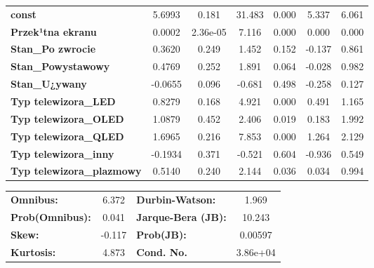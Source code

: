 \documentclass[11pt,a4paper]{article}
\begin{document}
\begin{center}
\begin{tabular}{lcccccc}
					\textbf{const}                    &       5.6993  &        0.181     &    31.483  &         0.000        &        5.337    &        6.061     \\
					\textbf{Przek¹tna ekranu}         &       0.0002  &     2.36e-05     &     7.116  &         0.000        &        0.000    &        0.000     \\
					\textbf{Stan\_Po zwrocie}         &       0.3620  &        0.249     &     1.452  &         0.152        &       -0.137    &        0.861     \\
					\textbf{Stan\_Powystawowy}        &       0.4769  &        0.252     &     1.891  &         0.064        &       -0.028    &        0.982     \\
					\textbf{Stan\_U¿ywany}            &      -0.0655  &        0.096     &    -0.681  &         0.498        &       -0.258    &        0.127     \\
					\textbf{Typ telewizora\_LED}      &       0.8279  &        0.168     &     4.921  &         0.000        &        0.491    &        1.165     \\
					\textbf{Typ telewizora\_OLED}     &       1.0879  &        0.452     &     2.406  &         0.019        &        0.183    &        1.992     \\
					\textbf{Typ telewizora\_QLED}     &       1.6965  &        0.216     &     7.853  &         0.000        &        1.264    &        2.129     \\
					\textbf{Typ telewizora\_inny}     &      -0.1934  &        0.371     &    -0.521  &         0.604        &       -0.936    &        0.549     \\
					\textbf{Typ telewizora\_plazmowy} &       0.5140  &        0.240     &     2.144  &         0.036        &        0.034    &        0.994     \\
					 
				\end{tabular}
				\begin{tabular}{lclc}
					\textbf{Omnibus:}       &  6.372 & \textbf{  Durbin-Watson:     } &    1.969  \\
					\textbf{Prob(Omnibus):} &  0.041 & \textbf{  Jarque-Bera (JB):  } &   10.243  \\
					\textbf{Skew:}          & -0.117 & \textbf{  Prob(JB):          } &  0.00597  \\
					\textbf{Kurtosis:}      &  4.873 & \textbf{  Cond. No.          } & 3.86e+04  \\
					 
				\end{tabular}
			\end{center}
		
\end{document}
